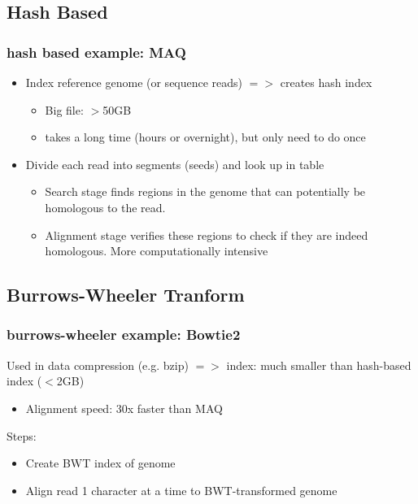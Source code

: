 \documentclass[pdf]{beamer}
\begin{document}
\subsection{Hash Based}
\begin{frame}
  \frametitle{hash based example: MAQ}
  \begin{itemize}
  \item  Index reference genome (or sequence reads) $=>$ creates hash index       
  \begin{itemize}
   \item Big file: $>$50GB 
   \item takes a long time (hours or overnight), but only need to do once
  \end{itemize}
  \item Divide each read into segments (seeds) and look up in table
  \begin{itemize}
  \item Search stage finds regions in the genome that can potentially be homologous to the read. 
  \item Alignment stage verifies these regions to check if they are indeed homologous. More computationally intensive
  \end{itemize}
  \end{itemize}
\end{frame}

\subsection{Burrows-Wheeler Tranform}
\begin{frame}
  \frametitle{burrows-wheeler example: Bowtie2}
   Used in data compression (e.g. bzip) $=>$ index: much smaller than hash-based index ($<$2GB)
\begin{itemize}
\item Alignment speed: 30x faster than MAQ
\end{itemize}
Steps:\\
\begin{itemize}
\item Create BWT index of genome
\item Align read 1 character at a time to BWT-transformed genome
\end{itemize}
\end{frame}
\end{document}
